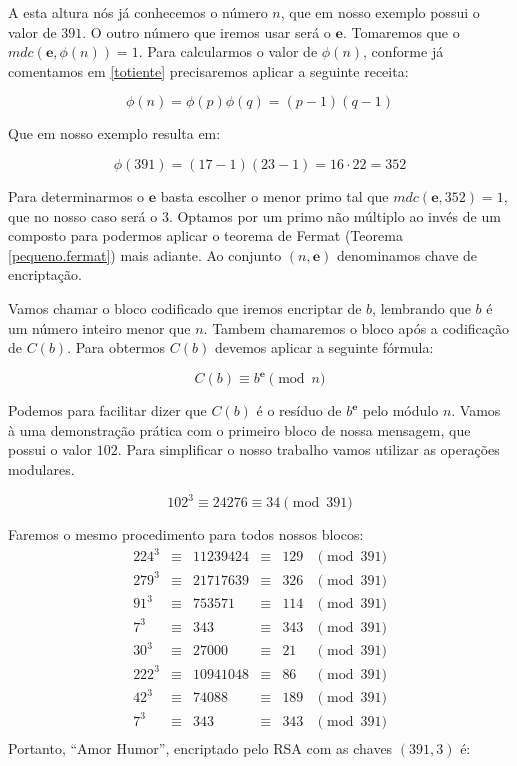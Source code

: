 A esta altura n\'os j\'a conhecemos o n\'umero $n$, que em nosso exemplo possui o valor de $391$. O outro n\'umero que iremos usar ser\'a o $\textbf{e}$. Tomaremos que o $mdc(\textbf{e}, \phi(n)) = 1$. Para calcularmos o valor de $\phi(n)$, conforme j\'a comentamos em \ref{totiente} precisaremos aplicar a seguinte receita:

$$\phi(n) = \phi(p)\phi(q) = (p-1)(q-1)$$

Que em nosso exemplo resulta em:

$$\phi(391) = (17 - 1)(23 - 1) = 16 \cdot 22 = 352$$

Para determinarmos o $\textbf{e}$ basta escolher o menor primo tal que $mdc(\textbf{e}, 352) = 1$, que no nosso caso ser\'a o $3$. Optamos por um primo n\~ao m\'ultiplo ao inv\'es de um composto para podermos aplicar o teorema de Fermat  (Teorema \ref{pequeno.fermat}) mais adiante. Ao conjunto $(n, \textbf{e} )$ denominamos chave de encripta\c{c}\~ao.

Vamos chamar o bloco codificado que iremos encriptar de $b$, lembrando que $b$ \'e um n\'umero inteiro menor que $n$. Tambem chamaremos o bloco ap\'os a codifica\c{c}\~ao de $C(b)$. Para obtermos $C(b)$ devemos aplicar a seguinte f\'ormula:

$$C(b) \equiv b^\textbf{e} \pmod{n} $$

Podemos para facilitar dizer que $C(b)$ \'e o res\'iduo de $b^\textbf{e}$ pelo m\'odulo $n$. Vamos \`a uma demonstra\c{c}\~ao pr\'atica com o primeiro bloco de nossa mensagem, que possui o valor $102$. Para simplificar o nosso trabalho vamos utilizar as opera\c{c}\~oes modulares.

$$102^3 \equiv 24276 \equiv 34 \pmod{391}$$

Faremos o mesmo procedimento para todos nossos blocos:
\[
\begin{array}{cccccc}
224^3& \equiv& 11239424& \equiv& 129& \pmod{391}\\
279^3& \equiv& 21717639& \equiv& 326& \pmod{391}\\
91^3&  \equiv& 753571&   \equiv& 114& \pmod{391}\\
7^3&   \equiv& 343&      \equiv& 343& \pmod{391}\\
30^3&  \equiv& 27000&    \equiv& 21&  \pmod{391}\\
222^3& \equiv& 10941048& \equiv& 86&  \pmod{391}\\
42^3&  \equiv& 74088&    \equiv& 189& \pmod{391}\\
7^3&   \equiv& 343&      \equiv& 343& \pmod{391}\\
\end{array}
\]
Portanto, ``Amor Humor'', encriptado pelo RSA com as chaves $(391 , 3)$ \'e: 

